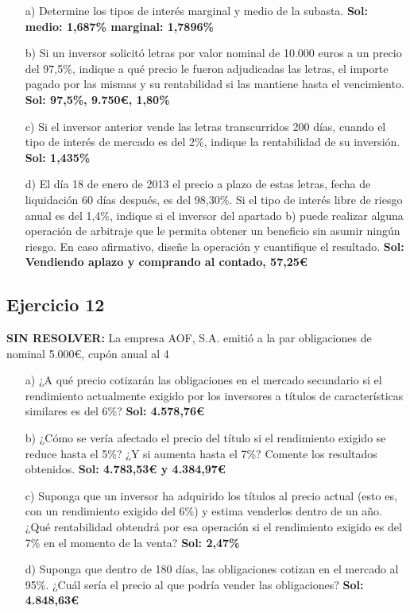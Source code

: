     \begin{enumerate}
        \item[a)] Determine los tipos de interés marginal y medio de la subasta. \textbf{Sol: medio: 1,687\% marginal: 1,7896\%}
        \item[b)] Si un inversor solicitó letras por valor nominal de 10.000 euros a un precio del 97,5\%, indique a qué precio le fueron adjudicadas las letras, el importe pagado por las mismas y su rentabilidad si las mantiene hasta el vencimiento. \textbf{Sol: 97,5\%, 9.750€, 1,80\%}
        \item[c)] Si el inversor anterior vende las letras transcurridos 200 días, cuando el tipo de interés de mercado es del 2\%, indique la rentabilidad de su inversión. \textbf{Sol: 1,435\%}
        \item[d)] El día 18 de enero de 2013 el precio a plazo de estas letras, fecha de liquidación 60 días después, es del 98,30\%. Si el tipo de interés libre de riesgo anual es del 1,4\%, indique si el inversor del apartado b) puede realizar alguna operación de arbitraje que le permita obtener un beneficio sin asumir ningún riesgo. En caso afirmativo, diseñe la operación y cuantifique el resultado. \textbf{Sol: Vendiendo aplazo y comprando al contado, 57,25€}
    \end{enumerate}

    \subsection*{Ejercicio 12}

    \textbf{SIN RESOLVER:} La empresa AOF, S.A. emitió a la par obligaciones de nominal 5.000€, cupón anual al 4%

    \begin{enumerate}
        \item[a)] ¿A qué precio cotizarán las obligaciones en el mercado secundario si el rendimiento actualmente exigido por los inversores a títulos de características similares es del 6\%? \textbf{Sol: 4.578,76€}
        \item[b)] ¿Cómo se vería afectado el precio del título si el rendimiento exigido se reduce hasta el 5\%? ¿Y si aumenta hasta el 7\%? Comente los resultados obtenidos. \textbf{Sol: 4.783,53€ y 4.384,97€}
        \item[c)] Suponga que un inversor ha adquirido los títulos al precio actual (esto es, con un rendimiento exigido del 6\%) y estima venderlos dentro de un año. ¿Qué rentabilidad obtendrá por esa operación si el rendimiento exigido es del 7\% en el momento de la venta? \textbf{Sol: 2,47\%}
        \item[d)] Suponga que dentro de 180 días, las obligaciones cotizan en el mercado al 95\%. ¿Cuál sería el precio al que podría vender las obligaciones? \textbf{Sol: 4.848,63€}
    \end{enumerate}


